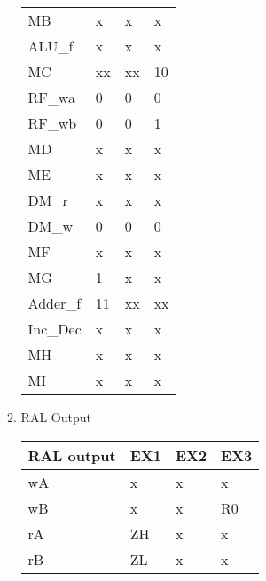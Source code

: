 \documentclass[12pt,letterpaper]{article}
\begin{document}
\begin{enumerate}
\begin{enumerate}
\begin{tabular}{l l l l}
                 MB & x & x & x \\
                 ALU\_f & x & x & x \\
                 MC & xx & xx & 10 \\
                 RF\_wa & 0 & 0 & 0 \\
                 RF\_wb & 0 & 0 & 1 \\
                 MD & x & x & x \\
                 ME & x & x & x \\
                 DM\_r & x & x & x \\
                 DM\_w & 0 & 0 & 0 \\
                 MF & x & x & x \\
                 MG & 1 & x & x \\
                 Adder\_f & 11 & xx & xx \\
                 Inc\_Dec & x & x & x \\
                 MH & x & x & x \\
                 MI & x & x & x \\
            \end{tabular}

        \item RAL Output\\
            \begin{tabular}{l l l l}
                 RAL output & EX1 & EX2 & EX3 \\
                 \hline
                 wA & x & x & x \\
                 wB & x & x & R0 \\
                 rA & ZH & x & x \\
                 rB & ZL & x & x \\
            \end{tabular}

    \end{enumerate}

\end{enumerate}
\end{document}
